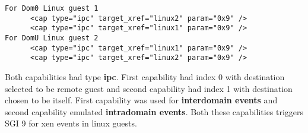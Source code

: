 \begin{lstlisting}[caption=Capabilities added for event notifications in guest configuration on PHIDIAS, label={cap}]
For Dom0 Linux guest 1
      <cap type="ipc" target_xref="linux2" param="0x9" /> 
      <cap type="ipc" target_xref="linux1" param="0x9" /> 
For DomU Linux guest 2
      <cap type="ipc" target_xref="linux1" param="0x9" /> 
      <cap type="ipc" target_xref="linux2" param="0x9" /> 
\end{lstlisting}

Both capabilities had type \textbf{ipc}. First capability had index 0 with destination selected to be remote guest and second capability had index 1 with destination chosen to be itself. First capability was used for \textbf{interdomain events} and second capability emulated \textbf{intradomain events}. Both these capabilities triggers SGI 9 for xen events in linux guests.

